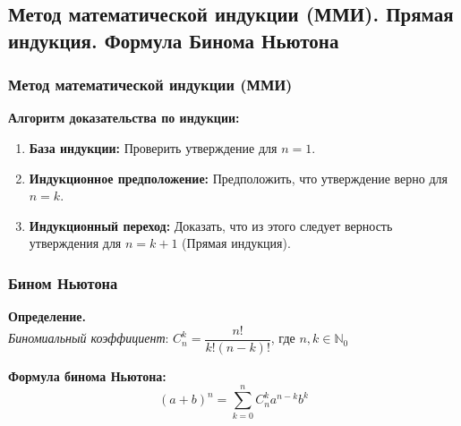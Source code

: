 \subsection{Метод математической индукции (ММИ). Прямая индукция. Формула Бинома Ньютона}

\subsubsection*{Метод математической индукции (ММИ)}
\begin{tcolorbox}
\textbf{Алгоритм доказательства по индукции:}
\begin{enumerate}
    \item \textbf{База индукции:} Проверить утверждение для $n = 1$.
    \item \textbf{Индукционное предположение:} Предположить, что утверждение верно для $n = k$.
    \item \textbf{Индукционный переход:} Доказать, что из этого следует верность утверждения для $n = k+1$ (Прямая индукция).
\end{enumerate}
\end{tcolorbox}

\subsubsection*{Бином Ньютона}
\begin{tcolorbox}
\textbf{Определение.}\\
\textit{Биномиальный коэффициент}:
$C_n^k = \dfrac{n!}{k!(n-k)!}$, где $n,k \in \mathbb{N}_0$\\
\end{tcolorbox}

\begin{tcolorbox}
\textbf{Формула бинома Ньютона:}
$$(a+b)^n = \sum_{k=0}^{n} C_n^k a^{n-k}b^k$$
\end{tcolorbox}

